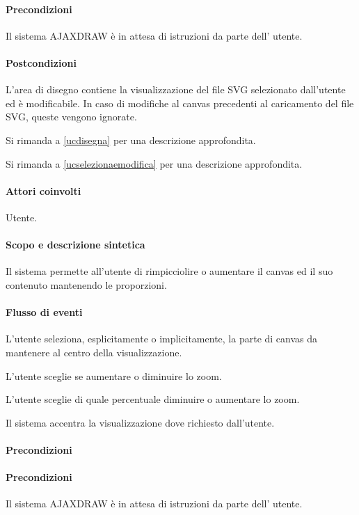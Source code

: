 \paragraph{Precondizioni} Il sistema AJAXDRAW \`e in attesa di istruzioni da parte dell' utente.
\paragraph{Postcondizioni} L'area di disegno contiene la visualizzazione del file SVG selezionato dall'utente ed \`e modificabile. In caso di modifiche al canvas precedenti al caricamento del file SVG, queste vengono ignorate.

Si rimanda a \ref{ucdisegna} per una descrizione approfondita.

Si rimanda a \ref{ucselezionaemodifica} per una descrizione approfondita.

\paragraph{Attori coinvolti} Utente.
\paragraph{Scopo e descrizione sintetica} 
Il sistema permette all'utente di rimpicciolire o aumentare il canvas ed il suo contenuto mantenendo le proporzioni.
\paragraph{Flusso di eventi}
\begin{elenconumerato}[\textbf{}]{\subsubsecindent}
\item L'utente seleziona, esplicitamente o implicitamente, la parte di canvas da mantenere al centro della visualizzazione.
\item L'utente sceglie se aumentare o diminuire lo zoom.
\item L'utente sceglie di quale percentuale diminuire o aumentare lo zoom.
\item Il sistema accentra la visualizzazione dove richiesto dall'utente.
\end{elenconumerato}
\paragraph{Precondizioni} 
\paragraph{Precondizioni} Il sistema AJAXDRAW \`e in attesa di istruzioni da parte dell' utente.
